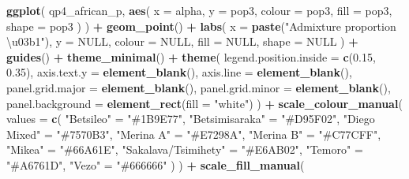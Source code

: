 \documentclass[
]{article}
\newenvironment{Shaded}{\begin{snugshade}}{\end{snugshade}}
\newcommand{\AttributeTok}[1]{\textcolor[rgb]{0.13,0.29,0.53}{#1}}
\newcommand{\ConstantTok}[1]{\textcolor[rgb]{0.56,0.35,0.01}{#1}}
\newcommand{\FloatTok}[1]{\textcolor[rgb]{0.00,0.00,0.81}{#1}}
\newcommand{\FunctionTok}[1]{\textcolor[rgb]{0.13,0.29,0.53}{\textbf{#1}}}
\newcommand{\NormalTok}[1]{#1}
\newcommand{\OtherTok}[1]{\textcolor[rgb]{0.56,0.35,0.01}{#1}}
\newcommand{\SpecialCharTok}[1]{\textcolor[rgb]{0.81,0.36,0.00}{\textbf{#1}}}
\newcommand{\StringTok}[1]{\textcolor[rgb]{0.31,0.60,0.02}{#1}}
\begin{document}
\begin{Shaded}
\begin{Highlighting}[]
\FunctionTok{ggplot}\NormalTok{(}
\NormalTok{  qp4\_african\_p,}
  \FunctionTok{aes}\NormalTok{(}
    \AttributeTok{x =}\NormalTok{ alpha, }\AttributeTok{y =}\NormalTok{ pop3, }\AttributeTok{colour =}\NormalTok{ pop3,}
    \AttributeTok{fill =}\NormalTok{ pop3, }\AttributeTok{shape =}\NormalTok{ pop3}
\NormalTok{  )}
\NormalTok{) }\SpecialCharTok{+}
  \FunctionTok{geom\_point}\NormalTok{() }\SpecialCharTok{+}
  \FunctionTok{labs}\NormalTok{(}
    \AttributeTok{x =} \FunctionTok{paste}\NormalTok{(}\StringTok{"Admixture proportion \textbackslash{}u03b1"}\NormalTok{), }\AttributeTok{y =} \ConstantTok{NULL}\NormalTok{,}
    \AttributeTok{colour =} \ConstantTok{NULL}\NormalTok{, }\AttributeTok{fill =} \ConstantTok{NULL}\NormalTok{, }\AttributeTok{shape =} \ConstantTok{NULL}
\NormalTok{  ) }\SpecialCharTok{+}
  \FunctionTok{guides}\NormalTok{() }\SpecialCharTok{+}
  \FunctionTok{theme\_minimal}\NormalTok{() }\SpecialCharTok{+}
  \FunctionTok{theme}\NormalTok{(}
    \AttributeTok{legend.position.inside =} \FunctionTok{c}\NormalTok{(}\FloatTok{0.15}\NormalTok{, }\FloatTok{0.35}\NormalTok{),}
    \AttributeTok{axis.text.y =} \FunctionTok{element\_blank}\NormalTok{(),}
    \AttributeTok{axis.line =} \FunctionTok{element\_blank}\NormalTok{(),}
    \AttributeTok{panel.grid.major =} \FunctionTok{element\_blank}\NormalTok{(),}
    \AttributeTok{panel.grid.minor =} \FunctionTok{element\_blank}\NormalTok{(),}
    \AttributeTok{panel.background =} \FunctionTok{element\_rect}\NormalTok{(}\AttributeTok{fill =} \StringTok{"white"}\NormalTok{)}
\NormalTok{  ) }\SpecialCharTok{+}
  \FunctionTok{scale\_colour\_manual}\NormalTok{(}
    \AttributeTok{values =} \FunctionTok{c}\NormalTok{(}
      \StringTok{"Betsileo"} \OtherTok{=} \StringTok{"\#1B9E77"}\NormalTok{,}
      \StringTok{"Betsimisaraka"} \OtherTok{=} \StringTok{"\#D95F02"}\NormalTok{,}
      \StringTok{"Diego Mixed"} \OtherTok{=} \StringTok{"\#7570B3"}\NormalTok{,}
      \StringTok{"Merina A"} \OtherTok{=} \StringTok{"\#E7298A"}\NormalTok{,}
      \StringTok{"Merina B"} \OtherTok{=} \StringTok{"\#C77CFF"}\NormalTok{,}
      \StringTok{"Mikea"} \OtherTok{=} \StringTok{"\#66A61E"}\NormalTok{,}
      \StringTok{"Sakalava/Tsimihety"} \OtherTok{=} \StringTok{"\#E6AB02"}\NormalTok{,}
      \StringTok{"Temoro"} \OtherTok{=} \StringTok{"\#A6761D"}\NormalTok{,}
      \StringTok{"Vezo"} \OtherTok{=} \StringTok{"\#666666"}
\NormalTok{    )}
\NormalTok{  ) }\SpecialCharTok{+}
  \FunctionTok{scale\_fill\_manual}\NormalTok{(}

\end{Highlighting}
\end{Shaded}
\end{document}
